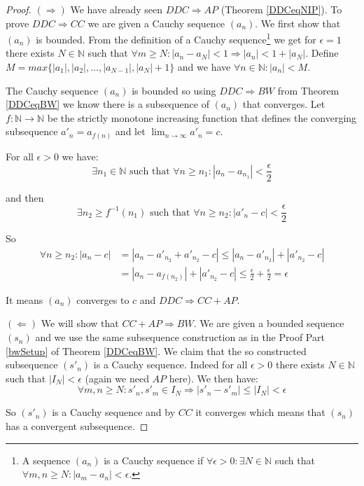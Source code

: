\begin{proof}
\noindent$(\Rightarrow)$ We have already seen $DDC \Rightarrow AP$ (Theorem \ref{DDCeqNIP}). To prove $DDC \Rightarrow CC$ we are given a Cauchy sequence $(a_n)$. We first show that $(a_n)$ is bounded. From the definition of a Cauchy sequence\footnote{A sequence $(a_n)$ is a Cauchy sequence if $\forall \epsilon > 0: \exists N \in \mathbb{N}$ such that $\forall m,n \geq N: |a_m - a_n| < \epsilon$.} we get  for $\epsilon = 1$ there exists $N \in \mathbb{N}$ such that $\forall m \geq N: |a_n - a_N| < 1 \Rightarrow |a_n| < 1 + |a_N|$. Define $M = max\{|a_1|, |a_2|, \ldots, |a_{N-1}|, |a_N| + 1\}$ and we have $\forall n \in \mathbb{N}: |a_n| < M$. 

The Cauchy sequence $(a_n)$ is bounded so using $DDC \Rightarrow BW$ from Theorem \ref{DDCeqBW} we know there is a subsequence of $(a_n)$ that converges. Let $f: \mathbb{N} \to \mathbb{N}$ be the strictly monotone increasing function that defines the converging subsequence $a'_n = a_{f(n)}$ and let $\lim_{n \to \infty} a'_n = c$.

For all $\epsilon >0$ we have: 
\[
\exists n_1 \in \mathbb{N} \text{ such that } \forall n \geq n_1: |a_n - a_{n_1}| < \frac{\epsilon}{2}
\]

and then 
\[
\exists n_2 \geq f^{-1}(n_1) \text{ such that } \forall n \geq n_2: |a'_n - c| < \frac{\epsilon}{2}
\]

So 
\begin{align*}
\forall n \geq n_2: |a_n - c| &= |a_n - a'_{n_2} + a'_{n_2} - c| \leq |a_n - a'_{n_2}| + |a'_{n_2} - c| \\
                              &= |a_n - a_{f(n_2)}| + |a'_{n_2} - c| \leq \frac{\epsilon}{2} + \frac{\epsilon}{2} = \epsilon
\end{align*}

It means $(a_n)$ converges to $c$ and $DDC \Rightarrow CC + AP$.

\noindent$(\Leftarrow)$ We will show that $CC + AP \Rightarrow BW$. We are given a bounded sequence $(s_n)$ and we use the same subsequence construction as in the Proof Part \ref{bwSetup} of Theorem \ref{DDCeqBW}. We claim that the so constructed subsequence $(s'_n)$ is a Cauchy sequence. Indeed for all $\epsilon > 0$ there exists $N \in \mathbb{N}$ such that $|I_N| < \epsilon$ (again we need $AP$ here). We then have:
\[
\forall m,n \geq N: s'_n, s'_m \in I_N \Rightarrow |s'_n - s'_m| \leq |I_N| < \epsilon
\]

So $(s'_n)$ is a Cauchy sequence and by $CC$ it converges which means that $(s_n)$ has a convergent subsequence. 
\end{proof}


